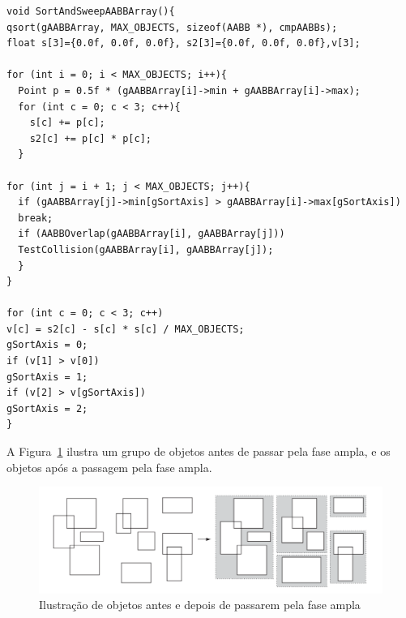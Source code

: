 \begin{lstlisting}[frame=single,caption=Exemplo de ordenar e varrer\label{code:SortAndSweep}]
void SortAndSweepAABBArray(){
qsort(gAABBArray, MAX_OBJECTS, sizeof(AABB *), cmpAABBs);
float s[3]={0.0f, 0.0f, 0.0f}, s2[3]={0.0f, 0.0f, 0.0f},v[3];

for (int i = 0; i < MAX_OBJECTS; i++){
  Point p = 0.5f * (gAABBArray[i]->min + gAABBArray[i]->max);
  for (int c = 0; c < 3; c++){
    s[c] += p[c];
    s2[c] += p[c] * p[c];
  }

for (int j = i + 1; j < MAX_OBJECTS; j++){
  if (gAABBArray[j]->min[gSortAxis] > gAABBArray[i]->max[gSortAxis])
  break;
  if (AABBOverlap(gAABBArray[i], gAABBArray[j]))
  TestCollision(gAABBArray[i], gAABBArray[j]);
  }
}

for (int c = 0; c < 3; c++)
v[c] = s2[c] - s[c] * s[c] / MAX_OBJECTS;
gSortAxis = 0;
if (v[1] > v[0])
gSortAxis = 1;
if (v[2] > v[gSortAxis])
gSortAxis = 2;
}
\end{lstlisting}

A Figura~\ref{fig:figura3} ilustra um grupo de objetos antes de passar pela fase ampla, e os objetos após a passagem pela fase ampla.
\begin{figure}[htb]
  \centering
	\caption{\label{fig:figura3} Ilustração de objetos antes e depois de passarem pela fase ampla}
	\includegraphics[scale=0.4]{Imagens/Figura_2.4.png} %
\end{figure}

